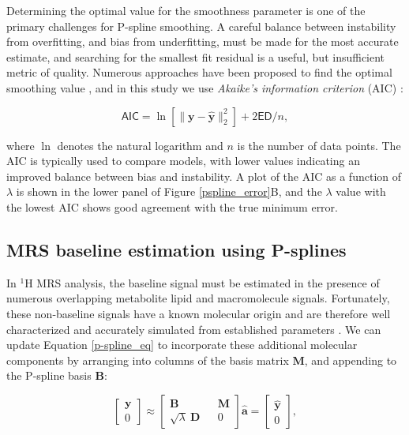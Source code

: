 \documentclass[num-refs]{wiley-article}
\begin{document}
Determining the optimal value for the smoothness parameter is one of the primary challenges for P-spline smoothing. A careful balance between instability from overfitting, and bias from underfitting, must be made for the most accurate estimate, and searching for the smallest fit residual is a useful, but insufficient metric of quality. Numerous approaches have been proposed to find the optimal smoothing value \cite{Ruppert2003}, and in this study we use \textit{Akaike's information criterion} (AIC) \cite{Akaike1973}:

\begin{equation}
  \textsf{AIC} = \ln \left[ \|\mathbf{y} - \hat{\mathbf{y}}\|^{2}_{2} \right] + 2 \textsf{ED} / n,
  \label{aic}
\end{equation}

where $\ln$ denotes the natural logarithm and $n$ is the number of data points. The AIC is typically used to compare models, with lower values indicating an improved balance between bias and instability. A plot of the AIC as a function of $\lambda$ is shown in the lower panel of Figure \ref{pspline_error}B, and the $\lambda$ value with the lowest AIC shows good agreement with the true minimum error.

\subsection{MRS baseline estimation using P-splines}

In $^1\mathrm{H}$ MRS analysis, the baseline signal must be estimated in the presence of numerous overlapping metabolite lipid and macromolecule signals. Fortunately, these non-baseline signals have a known molecular origin and are therefore well characterized and accurately simulated from established parameters \cite{Govind2015}. We can update Equation \ref{p-spline_eq} to incorporate these additional molecular components by arranging into columns of the basis matrix $\mathbf{M}$, and appending to the P-spline basis $\mathbf{B}$:

\begin{equation}
  \begin{bmatrix}
    \textbf{y} \\ 0
  \end{bmatrix}
  \approx
  \begin{bmatrix}
    \textbf{B} && \textbf{M} \\ \sqrt{\lambda} \ \textbf{D} && 0
  \end{bmatrix} \hat{\mathbf{a}} =
  \begin{bmatrix}
    \hat{\textbf{y}} \\ 0
  \end{bmatrix},
  \label{mrs_bl}
\end{equation}
\end{document}
